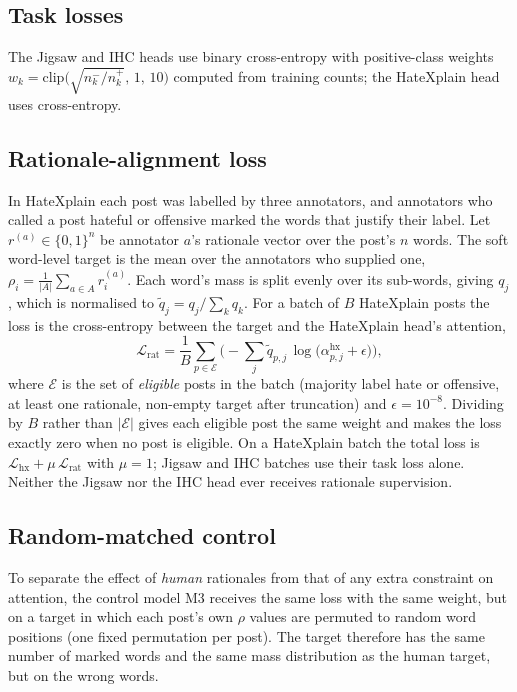 \documentclass[preprint,12pt,authoryear]{elsarticle}
\begin{document}
\subsection{Task losses}
The Jigsaw and IHC heads use binary cross-entropy with positive-class weights $w_k=\mathrm{clip}\big(\sqrt{n^{-}_k/n^{+}_k},\,1,\,10\big)$ computed from training counts; the HateXplain head uses cross-entropy.

\subsection{Rationale-alignment loss}
In HateXplain each post was labelled by three annotators, and annotators who called a post hateful or offensive marked the words that justify their label. Let $r^{(a)}\in\{0,1\}^{n}$ be annotator $a$'s rationale vector over the post's $n$ words. The soft word-level target is the mean over the annotators who supplied one, $\rho_i = \frac{1}{|A|}\sum_{a\in A} r^{(a)}_i$. Each word's mass is split evenly over its sub-words, giving $q_j$, which is normalised to $\tilde q_j = q_j/\sum_k q_k$. For a batch of $B$ HateXplain posts the loss is the cross-entropy between the target and the HateXplain head's attention,
\begin{equation}
\mathcal{L}_{\text{rat}} = \frac{1}{B}\sum_{p \in \mathcal{E}} \Big(-\sum_{j} \tilde q_{p,j}\,\log\big(\alpha^{\text{hx}}_{p,j}+\epsilon\big)\Big),
\end{equation}
where $\mathcal{E}$ is the set of \emph{eligible} posts in the batch (majority label hate or offensive, at least one rationale, non-empty target after truncation) and $\epsilon=10^{-8}$. Dividing by $B$ rather than $|\mathcal{E}|$ gives each eligible post the same weight and makes the loss exactly zero when no post is eligible. On a HateXplain batch the total loss is $\mathcal{L}_{\text{hx}} + \mu\,\mathcal{L}_{\text{rat}}$ with $\mu=1$; Jigsaw and IHC batches use their task loss alone. Neither the Jigsaw nor the IHC head ever receives rationale supervision.

\subsection{Random-matched control}
To separate the effect of \emph{human} rationales from that of any extra constraint on attention, the control model M3 receives the same loss with the same weight, but on a target in which each post's own $\rho$ values are permuted to random word positions (one fixed permutation per post). The target therefore has the same number of marked words and the same mass distribution as the human target, but on the wrong words.
\end{document}
